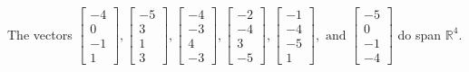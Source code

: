 \begin{exercise}
\begin{exerciseStatement}
  \end{exerciseStatement}
  \begin{exerciseAnswer}
   The vectors \(\left[\begin{array}{r}
-4 \\
0 \\
-1 \\
1
\end{array}\right] , \left[\begin{array}{r}
-5 \\
3 \\
1 \\
3
\end{array}\right] , \left[\begin{array}{r}
-4 \\
-3 \\
4 \\
-3
\end{array}\right] , \left[\begin{array}{r}
-2 \\
-4 \\
3 \\
-5
\end{array}\right] , \left[\begin{array}{r}
-1 \\
-4 \\
-5 \\
1
\end{array}\right] , \text{ and } \left[\begin{array}{r}
-5 \\
0 \\
-1 \\
-4
\end{array}\right]\) 
  	 do  
	span \(\mathbb{R}^4\).
  


  \end{exerciseAnswer}
\end{exercise}